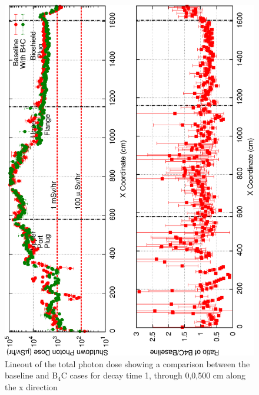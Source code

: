\documentclass[12pt]{article}
\begin{document}
\begin{figure}[ht!]
\centering
\includegraphics[angle=-90,clip,scale=0.15]{../plots/photon_lineout/dc1_z700_lineout.png}
\caption{Lineout of the total photon dose showing a comparison between the baseline and B$_4$C cases for decay time 1,
                 through 0,0,500 cm along the x direction}
\label{fig:photons_dc1_total_dose_lineout_z700}
\end{figure}
\end{document}

